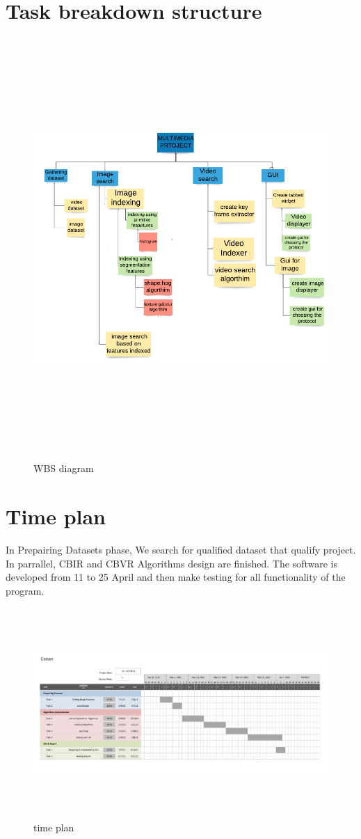 \documentclass[pdftex,10pt,a4paper,oneside]{article}
\begin{document}
	\section{Task breakdown structure}
		\begin{figure}[H]
		\centering
		\includegraphics[width=140mm,height=160mm]{fig/25.png}
		\caption{WBS diagram}
		\label{WBS diagram}
	\end{figure}
	\pagebreak
	\section{Time plan}
	In Prepairing Datasets phase, We search for qualified dataset that qualify project. In parrallel, CBIR and CBVR Algorithms design  are finished. The software is developed from 11 to 25 April and then make testing for all functionality of the program.
	
	
	\begin{figure}[H]
		\centering
		\includegraphics[width=140mm,height=80mm]{fig/5.png}
		\caption{time plan }
		\label{time plan}
	\end{figure}
	\pagebreak
\end{document}
